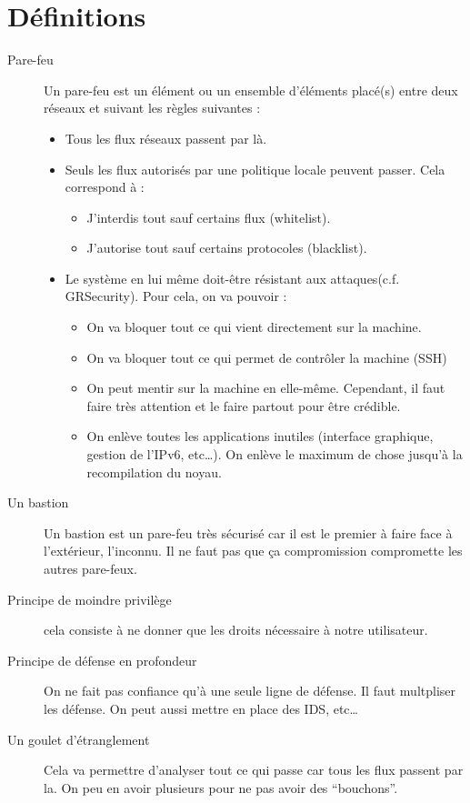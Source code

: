 \section{Définitions}
\begin{description}
 \item[Pare-feu] Un pare-feu est un élément ou un ensemble d'éléments placé(s) entre deux réseaux et suivant les règles suivantes :
\begin{itemize}
 \item Tous les flux réseaux passent par là.
 \item Seuls les flux autorisés par une politique locale peuvent passer. Cela correspond à :
 \begin{itemize}
  \item J'interdis tout sauf certains flux (whitelist).
  \item J'autorise tout sauf certains protocoles (blacklist).
 \end{itemize}
 \item Le système en lui même doit-être résistant aux attaques(c.f. GRSecurity). Pour cela, on va pouvoir :
 \begin{itemize}
  \item On va bloquer tout ce qui vient directement sur la machine.
  \item On va bloquer tout ce qui permet de contrôler la machine (SSH)
  \item On peut mentir sur la machine en elle-même. Cependant, il faut faire très attention et le faire partout pour être crédible.
  \item On enlève toutes les applications inutiles (interface graphique, gestion de l'IPv6, etc\ldots). On enlève le maximum de chose jusqu'à la recompilation du noyau.
 \end{itemize}
\end{itemize}
\item[Un bastion] Un bastion est un pare-feu très sécurisé car il est le premier à faire face à l'extérieur, l'inconnu. Il ne faut pas que ça compromission compromette les autres pare-feux.
\item[Principe de moindre privilège] cela consiste à ne donner que les droits nécessaire à notre utilisateur.
\item[Principe de défense en profondeur] On ne fait pas confiance qu'à une seule ligne de défense. Il faut multpliser les défense. On peut aussi mettre en place des IDS, etc\ldots
\item[Un goulet d'étranglement] Cela va permettre d'analyser tout ce qui passe car tous les flux passent par la. On peu en avoir plusieurs pour ne pas avoir des \enquote{bouchons}.

\end{description}
